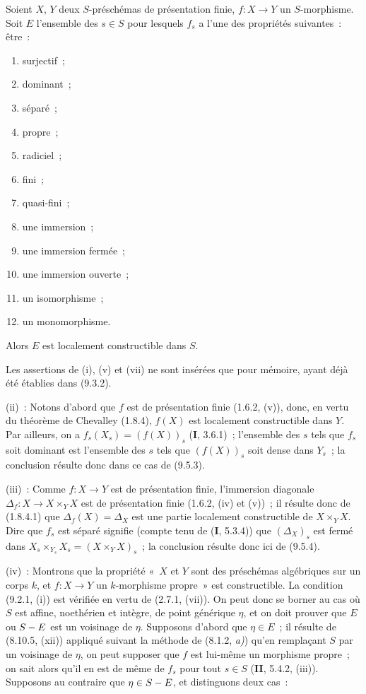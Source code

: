 \begin{proposition}[9.6.1]
\label{IV.9.6.1-fr}
Soient $X$, $Y$ deux $S$-préschémas de présentation finie, $f:X\to Y$ un
$S$-morphisme. Soit $E$ l'ensemble des $s\in S$ pour lesquels $f_s$ a l'une
des propriétés suivantes~: être~:
\begin{enumerate}[label=\textup{(\roman*)},widest=xii]
  \item surjectif~;
  \item dominant~;
  \item séparé~;
  \item propre~;
  \item radiciel~;
  \item fini~;
  \item quasi-fini~;
  \item une immersion~;
  \item une immersion fermée~;
  \item une immersion ouverte~;
  \item un isomorphisme~;
  \item un monomorphisme.
\end{enumerate}
Alors $E$ est localement constructible dans $S$.
\end{proposition}

Les assertions de (i), (v) et (vii) ne sont insérées que pour mémoire, ayant
déjà été établies dans (9.3.2).

(ii)~: Notons d'abord que $f$ est de présentation finie (1.6.2, (v)), donc, en
vertu du théorème de Chevalley (1.8.4), $f(X)$ est localement constructible dans
$Y$. Par ailleurs, on a $f_s(X_s)=(f(X))_s$ (\textbf{I}, 3.6.1)~; l'ensemble
des $s$ tels que $f_s$ soit dominant est l'ensemble des $s$ tels que
$(f(X))_s$ soit dense dans $Y_s$~; la conclusion résulte donc dans ce cas de
(9.5.3).

(iii)~: Comme $f:X\to Y$ est de présentation finie, l'immersion diagonale
$\Delta_f:X\to X\times_YX$ est de présentation finie (1.6.2, (iv) et (v))~; il
résulte donc de (1.8.4.1) que $\Delta_f(X)=\Delta_X$ est une partie localement
constructible de $X\times_YX$. Dire que $f_s$ est séparé signifie (compte tenu
de (\textbf{I}, 5.3.4)) que $(\Delta_X)_s$ est fermé dans
$X_s\times_{Y_s}X_s=(X\times_YX)_s$~; la conclusion résulte donc ici de
(9.5.4).

(iv)~: Montrons que la propriété «~$X$ et $Y$ sont des préschémas algébriques
sur un corps $k$, et $f:X\to Y$ un $k$-morphisme propre~» est constructible. La
condition (9.2.1, (i)) est vérifiée en vertu de (2.7.1, (vii)). On peut donc se
borner au cas où $S$ est affine, noethérien et intègre, de point générique
$\eta$, et on doit prouver que $E$ ou $S- E$ est un voisinage de $\eta$.
Supposons d'abord que $\eta\in E$~; il résulte de (8.10.5, (xii)) appliqué
suivant la méthode de (8.1.2, \emph{a)}) qu'en remplaçant $S$ par un voisinage
de $\eta$, on peut
supposer que $f$ est lui-même un morphisme propre~; on sait alors qu'il en est
de même de $f_s$ pour tout $s\in S$ (\textbf{II}, 5.4.2, (iii)). Supposons au
contraire que $\eta\in S- E$, et distinguons deux cas~:

